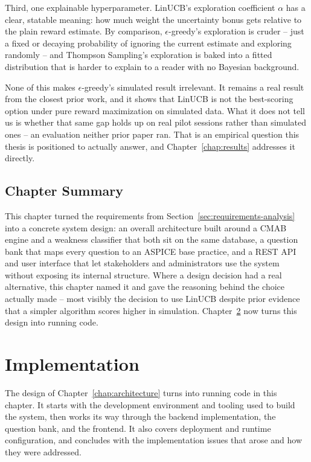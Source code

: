 \documentclass[a4paper, 12pt, oneside, openany, BCOR1cm,toc=chapterentrywithdots]{scrbook}
\begin{document}
Third, one explainable hyperparameter. LinUCB's exploration coefficient $\alpha$ has a
clear, statable meaning: how much weight the uncertainty bonus gets relative to the plain reward
estimate. By comparison, $\epsilon$-greedy's exploration is cruder -- just a fixed or decaying
probability of ignoring the current estimate and exploring randomly -- and Thompson Sampling's
exploration is baked into a fitted distribution that is harder to explain to a reader with no
Bayesian background.

None of this makes $\epsilon$-greedy's simulated result irrelevant. It remains a real result from
the closest prior work, and it shows that LinUCB is not the best-scoring option under pure reward
maximization on simulated data. What it does not tell us is whether that same gap holds up on
real pilot sessions rather than simulated ones -- an evaluation neither prior paper ran. That is
an empirical question this thesis is positioned to actually answer, and
Chapter~\ref{chap:results} addresses it directly.

\section{Chapter Summary}

This chapter turned the requirements from Section~\ref{sec:requirements-analysis} into a
concrete system design: an overall architecture built around a CMAB engine and a weakness
classifier that both sit on the same database, a question bank that maps every question to an
ASPICE base practice, and a REST API and user interface that let stakeholders and administrators
use the system without exposing its internal structure. Where a design decision had a real
alternative, this chapter named it and gave the reasoning behind the choice actually made --
most visibly the decision to use LinUCB despite prior evidence that a simpler algorithm scores
higher in simulation. Chapter~\ref{chap:implementation} now turns this design into running code.

\chapter{Implementation}
\label{chap:implementation}
% 

The design of Chapter~\ref{chap:architecture} turns into running code in this chapter. It starts
with the development environment and tooling used to build the system, then works its way
through the backend implementation, the question bank, and the frontend. It also covers
deployment and runtime configuration, and concludes with the implementation issues that arose
and how they were addressed.
\end{document}
